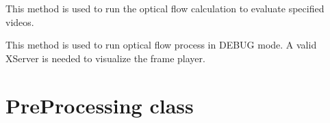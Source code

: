 \documentclass[letterpaper,10pt,english]{sphinxmanual}
\begin{document}
\begin{fulllineitems}
\begin{fulllineitems}
\begin{quote}
\begin{description}
\end{description}\end{quote}

\end{fulllineitems}


\begin{fulllineitems}
\label{\detokenize{OpticalFlow:cmc.OpticalFlow.OpticalFlow.run_eval}}
This method is used to run the optical flow calculation to evaluate specified videos.

\end{fulllineitems}


\begin{fulllineitems}
\label{\detokenize{OpticalFlow:cmc.OpticalFlow.OpticalFlow.run_manual_evaluation}}
This method is used to run optical flow process in DEBUG mode. A valid X\sphinxhyphen{}Server is needed to visualize the frame player.

\end{fulllineitems}


\end{fulllineitems}



\section{PreProcessing class}
\label{\detokenize{PreProcessing:preprocessing-class}}\label{\detokenize{PreProcessing::doc}}
\end{document}
